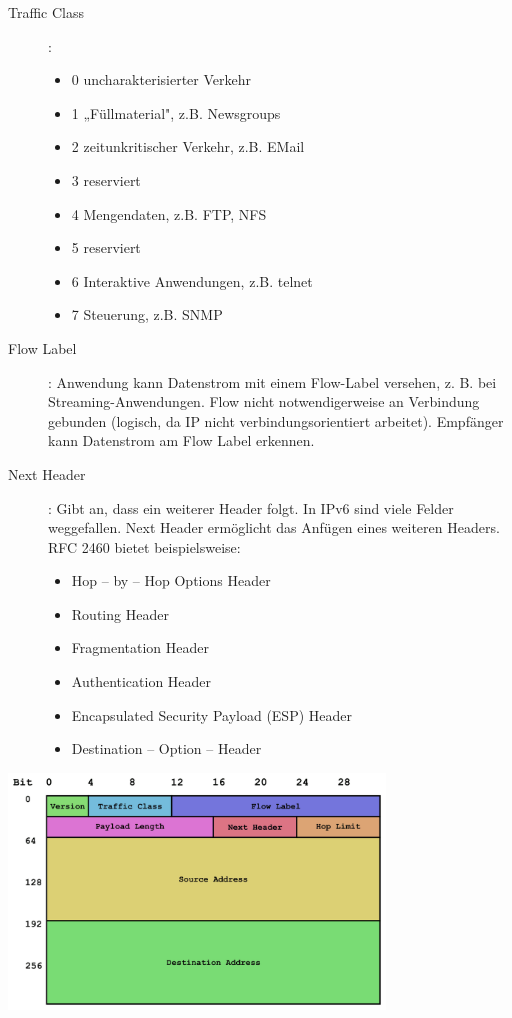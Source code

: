 \documentclass{article} %
\begin{document}
\begin{description}
	\item [Traffic Class]: \begin{itemize}
		\item 0 uncharakterisierter Verkehr
		\item 1 „Füllmaterial", z.B. Newsgroups
		\item 2 zeitunkritischer Verkehr, z.B. EMail
		\item 3 reserviert
		\item 4 Mengendaten, z.B. FTP, NFS
		\item 5 reserviert
		\item 6 Interaktive Anwendungen, z.B. telnet
		\item 7 Steuerung, z.B. SNMP
	\end{itemize}
	\item [Flow Label]: Anwendung kann Datenstrom mit einem Flow-Label versehen, z. B. bei Streaming-Anwendungen.
	Flow nicht notwendigerweise an Verbindung gebunden (logisch, da IP nicht verbindungsorientiert arbeitet).
	Empfänger kann Datenstrom am Flow Label erkennen. \cite{rfc3697, rfc6437}
	\item[Next Header]: Gibt an, dass ein weiterer Header folgt.
	In IPv6 sind viele Felder weggefallen.
	Next Header ermöglicht das Anfügen eines weiteren Headers.
	RFC 2460\cite{rfc2460} bietet beispielsweise:
	\begin{itemize}
		\item Hop – by – Hop Options Header
		\item Routing Header
		\item Fragmentation Header
		\item Authentication Header
		\item Encapsulated Security Payload (ESP) Header
		\item Destination – Option – Header
	\end{itemize}
	 
\end{description}

\begin{center}
	\includegraphics[width=10cm]{img/IPv6_header}
\end{center}
\end{document}
